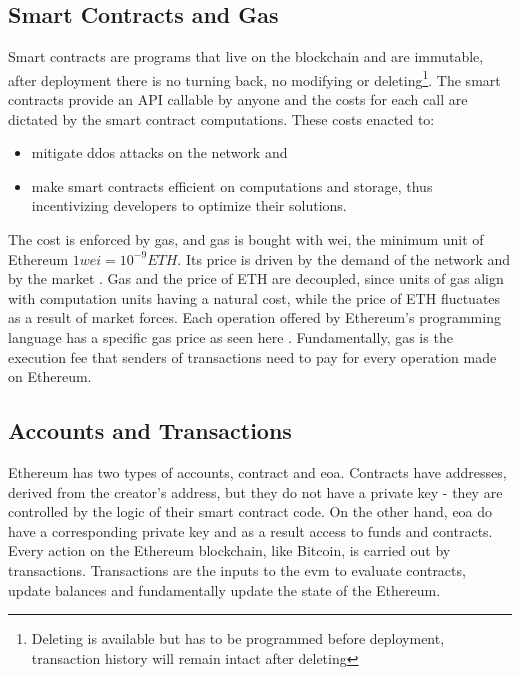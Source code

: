 \subsection{Smart Contracts and Gas}
 Smart contracts are programs that live on the blockchain and are immutable, after deployment there is no turning back, no modifying or deleting\footnote{Deleting is available but has to be programmed before deployment, transaction history will remain intact after deleting}.  The smart contracts provide an API callable by anyone and the costs for each call are dictated by the smart contract computations. These costs enacted to:
 \begin{itemize}
     \item mitigate \acrshort{ddos} attacks on the network and
     \item make smart contracts efficient on computations and storage, thus incentivizing developers to optimize their solutions.
 \end{itemize}
The cost is enforced by gas, and gas is bought with wei, the minimum unit of Ethereum $1 wei = 10^{-9}ETH$. Its price is driven by the demand of the network and by the market \cite{gasstation}.
Gas and the price of ETH are decoupled, since units of gas align with computation units having a natural cost, while the price of ETH fluctuates as a result of market forces. Each operation offered by Ethereum's programming language has a specific gas price as seen here \cite{eth-ops-gas}. Fundamentally, gas is the execution fee that senders of transactions need to pay for every operation made on Ethereum. 

\subsection{Accounts and Transactions}
Ethereum has two types of accounts, contract and \acrfull{eoa}. Contracts have addresses, derived from the creator's address, but they do not have a private key - they are controlled by the logic of their smart contract code. On the other hand, \acrshort{eoa} do have a corresponding private key and as a result access to funds and contracts. Every action on the Ethereum blockchain, like Bitcoin, is carried out by transactions. Transactions are the inputs to the \acrshort{evm} to evaluate contracts, update balances and fundamentally update the state of the Ethereum.

